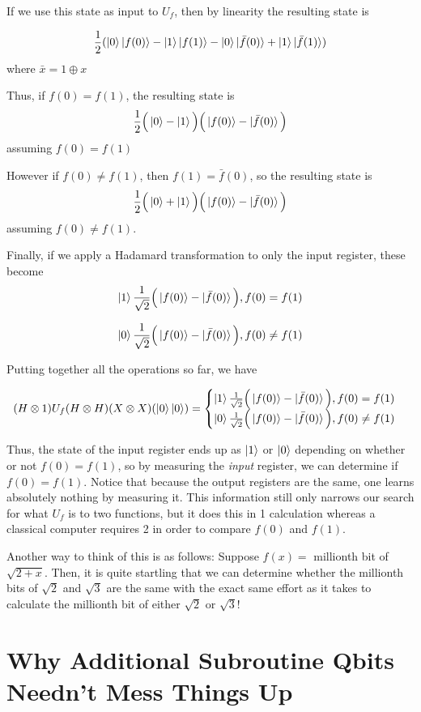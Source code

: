 \documentclass[letterpaper]{article}
\begin{document}
If we use this state as input to $U_{f}$, then by linearity the resulting state is 

$$ \frac{1}{2}(\ket{0}\ket{f(0)} - \ket{1}\ket{f(1)} - \ket{0} \ket{\bar{f}(0)} + \ket{1} \ket{\bar{f}(1)}) $$
where $\bar{x} = 1 \oplus x $

Thus, if $f(0) = f(1)$, the resulting state is 
$$ \frac{1}{2} \Big( \ket{0} - \ket{1} \Big) \Big( \ket{f(0)} - \ket{\bar{f}(0)} \Big) $$
assuming $f(0) = f(1)$

However if $f(0) \neq f(1)$, then $f(1) = \bar{f}(0)$, so the resulting state is
$$\frac{1}{2} \Big( \ket{0} + \ket{1} \Big) \Big( \ket{f(0)} - \ket{\bar{f}(0)} \Big)$$ assuming $f(0) \neq f(1)$.

Finally, if we apply a Hadamard transformation to only the input register, these become 
$$ \ket{1} \frac{1}{\sqrt{2}} \Big( \ket{f(0)} - \ket{\bar{f}(0)} \Big), f(0) = f(1) $$ 

$$ \ket{0} \frac{1}{\sqrt{2}} \Big( \ket{f(0)} - \ket{\bar{f}(0)} \Big), f(0) \neq f(1) $$

Putting together all the operations so far, we have 

$$(H \otimes 1)U_{f}(H \otimes H)(X \otimes X)(\ket{0} \ket{0}) = 
\begin{cases}
\ket{1} \frac{1}{\sqrt{2}} \Big( \ket{f(0)} - \ket{\bar{f}(0)} \Big), f(0) = f(1) \\ \ket{0} \frac{1}{\sqrt{2}} \Big( \ket{f(0)} - \ket{\bar{f}(0)} \Big), f(0) \neq f(1)
\end{cases}
$$

Thus, the state of the input register ends up as $\ket{1}$ or $\ket{0}$ depending on whether or not $f(0) = f(1)$, so by measuring the \textsl{input} register, we can determine if $f(0) = f(1)$. Notice that because the output registers are the same, one learns absolutely nothing by measuring it. This information still only narrows our search for what $U_{f}$ is to two functions, but it does this in 1 calculation whereas a classical computer requires 2 in order to compare $f(0)$ and $f(1)$. 

Another way to think of this is as follows: Suppose $f(x) = $ millionth bit of $\sqrt{2 + x}$. Then, it is quite startling that we can determine whether the millionth bits of $\sqrt{2}$ and $\sqrt{3}$ are the same with the exact same effort as it takes to calculate the millionth bit of either $\sqrt{2}$ or $\sqrt{3}$!

\section{Why Additional Subroutine Qbits Needn't Mess Things Up}
\end{document}
